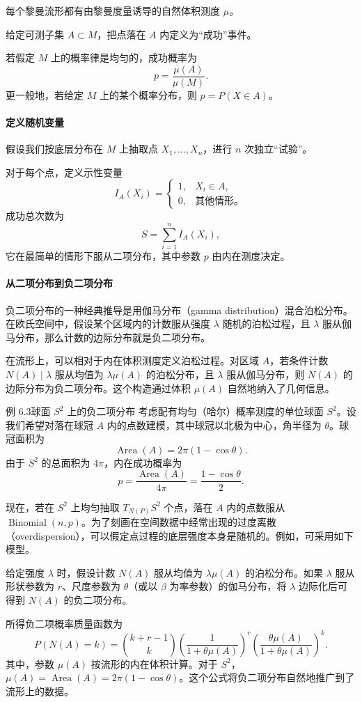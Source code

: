 每个黎曼流形都有由黎曼度量诱导的自然体积测度 $\mu$。

给定可测子集 $A\subset M$，把点落在 $A$ 内定义为“成功”事件。

若假定 $M$ 上的概率律是均匀的，成功概率为
\[
  p=\frac{\mu(A)}{\mu(M)}.
\]
更一般地，若给定 $M$ 上的某个概率分布，则 $p=P(X\in A)$。

\paragraph{定义随机变量}

假设我们按底层分布在 $M$ 上抽取点 $X_1,\ldots,X_n$，进行 $n$ 次独立“试验”。

对于每个点，定义示性变量
\[
  I_A(X_i)=
  \begin{cases}
    1,&X_i\in A,\\
    0,&\text{其他情形。}
  \end{cases}
\]
成功总次数为
\[
  S=\sum_{i=1}^{n} I_A(X_i),
\]
它在最简单的情形下服从二项分布，其中参数 $p$ 由内在测度决定。

\paragraph{从二项分布到负二项分布}

负二项分布的一种经典推导是用伽马分布（gamma distribution）混合泊松分布。在欧氏空间中，假设某个区域内的计数服从强度 $\lambda$ 随机的泊松过程，且 $\lambda$ 服从伽马分布，那么计数的边际分布就是负二项分布。

在流形上，可以相对于内在体积测度定义泊松过程。对区域 $A$，若条件计数 $N(A)\mid\lambda$ 服从均值为 $\lambda\mu(A)$ 的泊松分布，且 $\lambda$ 服从伽马分布，则 $N(A)$ 的边际分布为负二项分布。这个构造通过体积 $\mu(A)$ 自然地纳入了几何信息。

\begin{statement}{例 6.3}{球面 $S^2$ 上的负二项分布}
考虑配有均匀（哈尔）概率测度的单位球面 $S^2$。设我们希望对落在球冠 $A$ 内的点数建模，其中球冠以北极为中心，角半径为 $\theta$。球冠面积为
\[
  \operatorname{Area}(A)=2\pi(1-\cos\theta).
\]
由于 $S^2$ 的总面积为 $4\pi$，内在成功概率为
\[
  p=\frac{\operatorname{Area}(A)}{4\pi}=\frac{1-\cos\theta}{2}.
\]

现在，若在 $S^2$ 上均匀抽取 $T_{N(P)}S^2$ 个点，落在 $A$ 内的点数服从 $\operatorname{Binomial}(n,p)$。为了刻画在空间数据中经常出现的过度离散（overdispersion），可以假定点过程的底层强度本身是随机的。例如，可采用如下模型。

给定强度 $\lambda$ 时，假设计数 $N(A)$ 服从均值为 $\lambda\mu(A)$ 的泊松分布。如果 $\lambda$ 服从形状参数为 $r$、尺度参数为 $\theta$（或以 $\beta$ 为率参数）的伽马分布，将 $\lambda$ 边际化后可得到 $N(A)$ 的负二项分布。

所得负二项概率质量函数为
\[
  P(N(A)=k)=\binom{k+r-1}{k}
    \left(\frac{1}{1+\theta\mu(A)}\right)^r
    \left(\frac{\theta\mu(A)}{1+\theta\mu(A)}\right)^k.
\]
其中，参数 $\mu(A)$ 按流形的内在体积计算。对于 $S^2$，$\mu(A)=\operatorname{Area}(A)=2\pi(1-\cos\theta)$。这个公式将负二项分布自然地推广到了流形上的数据。
\end{statement}

